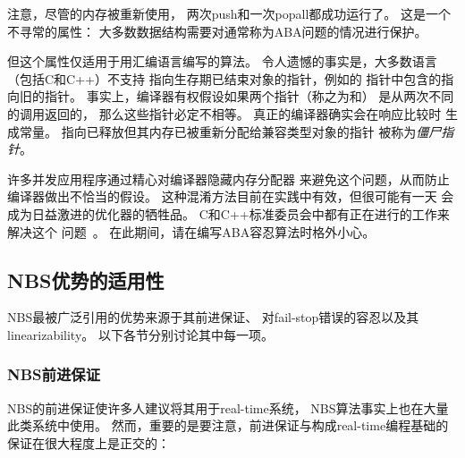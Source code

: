 \begin{fcvref}
注意，尽管的内存被重新使用，
两次push和一次popall都成功运行了。
这是一个不寻常的属性：
大多数数据结构需要对通常称为ABA问题的情况进行保护。

但这个属性仅适用于用汇编语言编写的算法。
令人遗憾的事实是，大多数语言（包括C和C++）不支持
指向生存期已结束对象的指针，例如的
指针中包含的指向旧的指针。
事实上，编译器有权假设如果两个指针（称之为和）
是从两次不同的调用返回的，
那么这些指针必定不相等。
真正的编译器确实会在响应比较时
生成常量。
指向已释放但其内存已被重新分配给兼容类型对象的指针
被称为\emph{僵尸指针}。

许多并发应用程序通过精心对编译器隐藏内存分配器
来避免这个问题，从而防止编译器做出不恰当的假设。
这种混淆方法目前在实践中有效，但很可能有一天
会成为日益激进的优化器的牺牲品。
C和C++标准委员会中都有正在进行的工作来解决这个
问题~\cite{PaulEMcKenney2019PointerLifetimeEndZap,PaulEMcKenney2020PointerLifetimeEndZapCpp}。
在此期间，请在编写ABA容忍算法时格外小心。
\end{fcvref}

\QuickQuizEnd

\subsection{NBS优势的适用性}
\label{sec:advsync:Applicability of NBS Benefits}

NBS最被广泛引用的优势来源于其前进保证、
对fail-stop错误的容忍以及其linearizability。
以下各节分别讨论其中每一项。

\subsubsection{NBS前进保证}
\label{sec:advsync:NBS Forward Progress Guarantees}

NBS的前进保证使许多人建议将其用于real-time系统，
NBS算法事实上也在大量此类系统中使用。
然而，重要的是要注意，前进保证与构成real-time编程基础的
保证在很大程度上是正交的：

